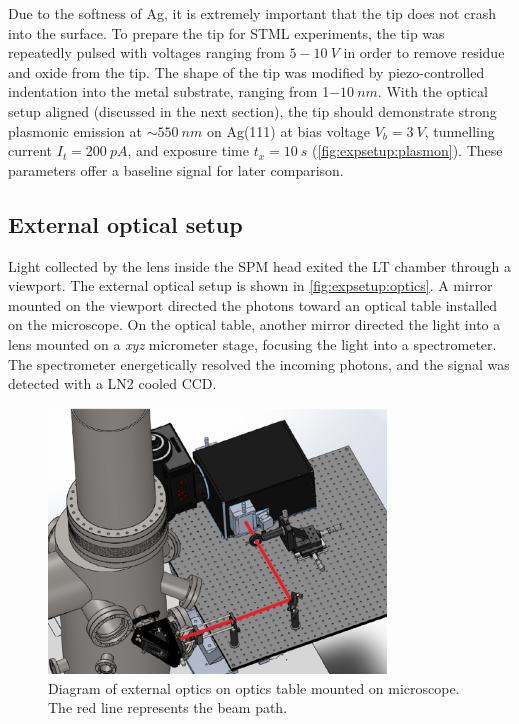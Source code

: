 Due to the softness of Ag, it is extremely important that the tip does not crash into the surface. To prepare the tip for \ac{STML} experiments, the tip was repeatedly pulsed with voltages ranging from $5-\SI{10}{V}$ in order to remove residue and oxide from the tip. The shape of the tip was modified by piezo-controlled indentation into the metal substrate, ranging from 1$\SI{-10}{nm}$. With the optical setup aligned (discussed in the next section), the tip should demonstrate strong plasmonic emission at $\sim \SI{550}{nm}$ on Ag(111) at bias voltage $V_b = \SI{3}{V}$, tunnelling current $I_t = \SI{200}{pA}$, and exposure time $t_x = \SI{10}{s}$ (\autoref{fig:expsetup:plasmon}). These parameters offer a baseline signal for later comparison.




\subsection{External optical setup}

Light collected by the lens inside the \ac{SPM} head exited the \ac{LT} chamber through a viewport. The external optical setup is shown in \autoref{fig:expsetup:optics}. A mirror mounted on the viewport directed the photons toward an optical table installed on the microscope. On the optical table, another mirror directed the light into a lens mounted on a \textit{xyz} micrometer stage, focusing the light into a spectrometer. The spectrometer energetically resolved the incoming photons, and the signal was detected with a \ac{LN2} cooled \ac{CCD}. 

\begin{figure} [h]
    \centering
    \includegraphics[width=0.8\textwidth]{pictures/optics.png}
    \caption{Diagram of external optics on optics table mounted on microscope. The red line represents the beam path.}
    \label{fig:expsetup:optics}
\end{figure}

